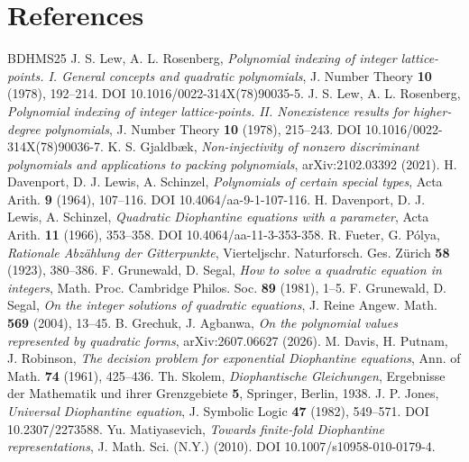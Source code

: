 \documentclass[11pt]{article}
\theoremstyle{plain}
\theoremstyle{definition}
\theoremstyle{remark}
\theoremstyle{plain}
\theoremstyle{definition}
\theoremstyle{remark}
\theoremstyle{plain}
\theoremstyle{definition}
\theoremstyle{remark}
\begin{document}
\section*{References}
\renewcommand{\refname}{}
\vspace{-\baselineskip}
\begin{thebibliography}{BDHMS25}
 J. S. Lew, A. L. Rosenberg, \emph{Polynomial indexing of integer lattice-points. I. General concepts and quadratic polynomials}, J. Number Theory \textbf{10} (1978), 192--214. DOI 10.1016/0022-314X(78)90035-5.
 J. S. Lew, A. L. Rosenberg, \emph{Polynomial indexing of integer lattice-points. II. Nonexistence results for higher-degree polynomials}, J. Number Theory \textbf{10} (1978), 215--243. DOI 10.1016/0022-314X(78)90036-7.
 K. S. Gjaldb\ae k, \emph{Non-injectivity of nonzero discriminant polynomials and applications to packing polynomials}, arXiv:2102.03392 (2021).
 H. Davenport, D. J. Lewis, A. Schinzel, \emph{Polynomials of certain special types}, Acta Arith. \textbf{9} (1964), 107--116. DOI 10.4064/aa-9-1-107-116.
 H. Davenport, D. J. Lewis, A. Schinzel, \emph{Quadratic Diophantine equations with a parameter}, Acta Arith. \textbf{11} (1966), 353--358. DOI 10.4064/aa-11-3-353-358.
 R. Fueter, G. P\'olya, \emph{Rationale Abz\"ahlung der Gitterpunkte}, Vierteljschr. Naturforsch. Ges. Z\"urich \textbf{58} (1923), 380--386.
 F. Grunewald, D. Segal, \emph{How to solve a quadratic equation in integers}, Math. Proc. Cambridge Philos. Soc. \textbf{89} (1981), 1–5.
 F. Grunewald, D. Segal, \emph{On the integer solutions of quadratic equations}, J. Reine Angew. Math. \textbf{569} (2004), 13–45.
 B. Grechuk, J. Agbanwa, \emph{On the polynomial values represented by quadratic forms}, arXiv:2607.06627 (2026).
 M. Davis, H. Putnam, J. Robinson, \emph{The decision problem for exponential Diophantine equations}, Ann. of Math. \textbf{74} (1961), 425–436.
 Th. Skolem, \emph{Diophantische Gleichungen}, Ergebnisse der Mathematik und ihrer Grenzgebiete \textbf{5}, Springer, Berlin, 1938.
 J. P. Jones, \emph{Universal Diophantine equation}, J. Symbolic Logic \textbf{47} (1982), 549–571. DOI 10.2307/2273588.
 Yu. Matiyasevich, \emph{Towards finite-fold Diophantine representations}, J. Math. Sci. (N.Y.) (2010). DOI 10.1007/s10958-010-0179-4.

\end{thebibliography}
\end{document}
